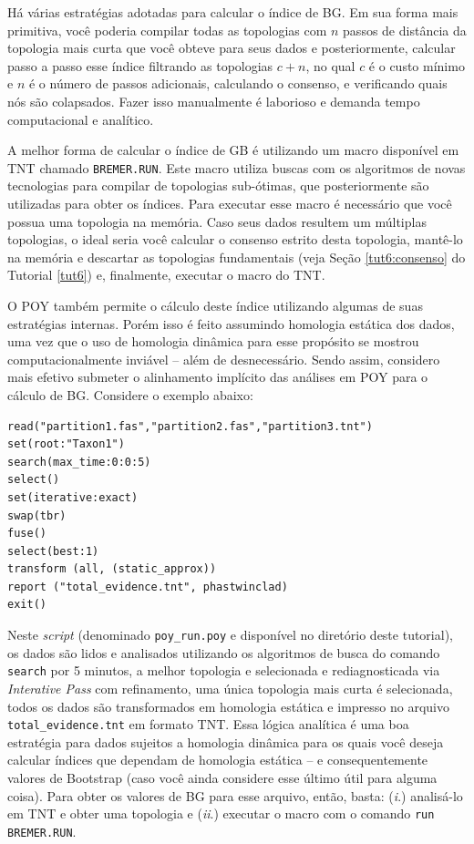 \begin{refsection}
Há várias estratégias adotadas para calcular o índice de BG. Em sua forma mais primitiva, você poderia compilar todas as topologias com $n$ passos de distância da topologia mais curta que você obteve para seus dados e posteriormente, calcular passo a passo esse índice filtrando as topologias $c+n$, no qual $c$ é o custo mínimo e $n$ é o número de passos adicionais, calculando o consenso, e verificando quais nós são colapsados. Fazer isso manualmente é laborioso e demanda tempo computacional e analítico.

A melhor forma de calcular o índice de GB é utilizando um macro disponível em TNT chamado \texttt{BREMER.RUN}. Este macro utiliza buscas com os algoritmos de novas tecnologias para compilar de topologias sub-ótimas, que posteriormente são utilizadas para obter os índices. Para executar esse macro é necessário que você possua uma topologia na memória. Caso seus dados resultem um múltiplas topologias, o ideal seria você calcular o consenso estrito desta topologia, mantê-lo na memória e descartar as topologias fundamentais (veja Seção \ref{tut6:consenso} do Tutorial \ref{tut6}) e, finalmente, executar o macro do TNT.

O POY também permite o cálculo deste índice utilizando algumas de suas estratégias internas. Porém isso é feito assumindo homologia estática dos dados, uma vez que o uso de homologia dinâmica para esse propósito se mostrou computacionalmente inviável -- além de desnecessário. Sendo assim, considero mais efetivo submeter o alinhamento implícito das análises em POY para o cálculo de BG. Considere o exemplo abaixo:\\

\begin{lstlisting}[label=tut14:bs]
read("partition1.fas","partition2.fas","partition3.tnt")
set(root:"Taxon1")
search(max_time:0:0:5)
select()
set(iterative:exact)
swap(tbr)
fuse()
select(best:1)
transform (all, (static_approx))
report ("total_evidence.tnt", phastwinclad)
exit()
\end{lstlisting}

\vspace{35pt}

Neste \textit{script} (denominado \texttt{poy\_run.poy} e disponível no diretório deste tutorial), os dados são lidos e analisados utilizando os algoritmos de busca do comando \texttt{search} por 5 minutos, a melhor topologia e selecionada e rediagnosticada via \textit{Interative Pass} com refinamento, uma única topologia mais curta é selecionada, todos os dados são transformados em homologia estática e impresso no arquivo \texttt{total\_evidence.tnt} em formato TNT. Essa lógica analítica é uma boa estratégia para dados sujeitos a homologia dinâmica para os quais você deseja calcular índices que dependam de homologia estática -- e consequentemente valores de Bootstrap (caso você ainda considere esse último útil para alguma coisa). Para obter os valores de BG para esse arquivo, então, basta: (\textit{i}.) analisá-lo em TNT e obter uma topologia e (\textit{ii}.) executar o macro com o comando \texttt{run BREMER.RUN}.\\


\end{refsection}
